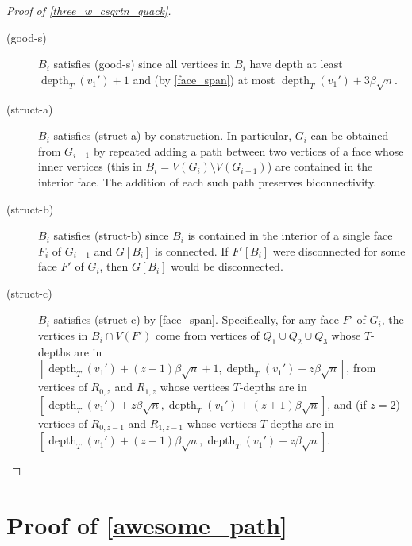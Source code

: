 \documentclass{patmorin}
\DeclareMathOperator{\depth}{depth}
\begin{document}
\begin{proof}[Proof of \cref{three_w_csqrtn_quack}]
\begin{description}
    \item[(good-s)] $B_i$ satisfies (good-s) since all vertices in $B_i$ have depth at least $\depth_T(v_1')+1$ and (by \cref{face_span}) at most $\depth_T(v_1')+3\beta\sqrt{n}$.

    \item[(struct-a)] $B_i$ satisfies (struct-a) by construction.  In particular, $G_i$ can be obtained from $G_{i-1}$ by repeated adding a path between two vertices of a face whose inner vertices (this in $B_i=V(G_i)\setminus V(G_{i-1})$) are contained in the interior face.  The addition of each such path preserves biconnectivity.

    \item[(struct-b)] $B_i$ satisfies (struct-b) since $B_i$ is contained in the interior of a single face $F_i$ of $G_{i-1}$ and $G[B_i]$ is connected.  If $F'[B_i]$ were disconnected for some face $F'$ of $G_i$, then $G[B_i]$ would be disconnected.

    \item[(struct-c)] $B_i$ satisfies (struct-c) by \cref{face_span}.  Specifically, for any face $F'$ of $G_i$, the vertices in $B_i\cap V(F')$ come from vertices of $Q_1\cup Q_2\cup Q_3$ whose $T$-depths are in $[\depth_T(v_1')+(z-1)\beta\sqrt{n}+1,\depth_T(v_1')+z\beta\sqrt{n}]$, from vertices of $R_{0,z}$ and $R_{1,z}$ whose vertices $T$-depths are in $[\depth_T(v_1')+z\beta\sqrt{n},\depth_T(v_1')+(z+1)\beta\sqrt{n}]$, and (if $z=2$) vertices of $R_{0,z-1}$ and $R_{1,z-1}$ whose vertices $T$-depths are in $[\depth_T(v_1')+(z-1)\beta\sqrt{n},\depth_T(v_1')+z\beta\sqrt{n}]$. \qedhere
  \end{description}
\end{proof}



\section{Proof of \cref{awesome_path}}
\label{crux_section}
\end{document}
